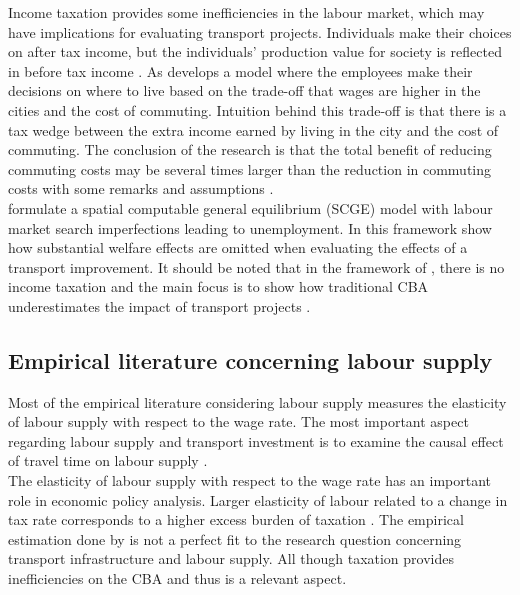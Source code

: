 Income taxation provides some inefficiencies in the labour market, which may have implications for evaluating transport projects. Individuals make their choices on after tax income, but the individuals' production value for society is reflected in before tax income \citep{andersson}. As \cite{venables2007} develops a model where the employees make their decisions on where to live based on the trade-off that wages are higher in the cities and the cost of commuting. Intuition behind this trade-off is that there is a tax wedge between the extra income earned by living in the city and the cost of commuting. The conclusion of the research is that the total benefit of reducing commuting costs may be several times larger than the reduction in commuting costs with some remarks and assumptions \citep{venables2007}. \\

\cite{pilegaard} formulate a spatial computable general equilibrium (SCGE) model with labour market search imperfections leading to unemployment. In this framework \cite{pilegaard} show how substantial welfare effects are omitted when evaluating the effects of a transport improvement. It should be noted that in the framework of \cite{pilegaard}, there is no income taxation and the main focus is to show how traditional CBA underestimates the impact of transport projects \citep{andersson}. \\

\subsection{Empirical literature concerning labour supply}

Most of the empirical literature considering labour supply measures the elasticity of labour supply with respect to the wage rate. The most important aspect regarding labour supply and transport investment is to examine the causal effect of travel time on labour supply \citep{andersson}.  \\

The elasticity of labour supply with respect to the wage rate has an important role in economic policy analysis. Larger elasticity of labour related to a change in tax rate corresponds to a higher excess burden of taxation \citep{evers}. The empirical estimation done by \cite{evers} is not a perfect fit to the research question concerning transport infrastructure and labour supply. All though taxation provides inefficiencies on the CBA and thus is a relevant aspect. \\

